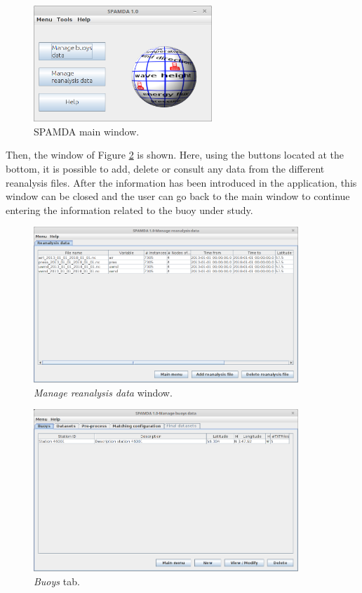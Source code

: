 \documentclass[review]{elsarticle}
\begin{document}
		\begin{figure}[ht]
			\centering
			\includegraphics[width=0.60\textwidth]{figures/FigureMain_view.png}
			\caption{SPAMDA main window.}\label{fig:main_view}
		\end{figure}
		
		Then, the window of Figure \ref{fig:reanalysis} is shown. Here, using the buttons located at the bottom, it is possible to add, delete or consult any data from the different reanalysis files. After the information has been introduced in the application, this window can be closed and the user can go back to the main window to continue entering the information related to the buoy under study. 
		
		\begin{figure}[ht!]
			\centering
			\includegraphics[width=0.89\textwidth]{figures/FigureManage_reanalysis_data.png}
			\caption{\textit{Manage reanalysis data} window.}\label{fig:reanalysis}
		\end{figure}
		
		\begin{figure}[ht!]
			\centering
			\includegraphics[width=0.89\textwidth]{figures/FigureManage_buoys.png}
			\caption{\textit{Buoys} tab.}\label{fig:manage_buoys}
		\end{figure}
		
\end{document}
